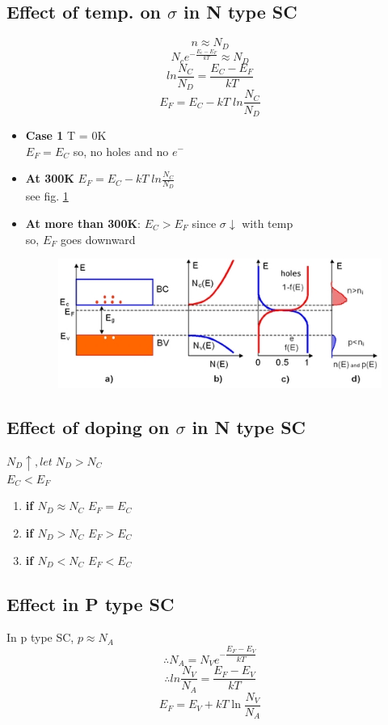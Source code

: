 \documentclass[10pt, a4paper]{report}
\begin{document}
	\subsection{Effect of temp. on $ \sigma $ in N type SC}
	$$ n \approx N_D $$
	$$ N_c  e^{-\frac{E_c-E_F}{kT}}  \approx N_D$$
	$$ ln\frac{N_C}{N_D}  = \frac{E_C - E_F}{kT}$$
	$$ E_F = E_C - kT\; ln \frac{N_C}{N_D} $$
	\begin{itemize}
		\item \textbf{Case 1} T = 0K \\
		$ E_F = E_C $ so, no holes and no $ e^- $
		\item \textbf{At 300K} $ E_F = E_C - k T\; ln \frac{N_C}{N_D} $ \\
		see fig. \ref{fig:fermilvlntype}
		\item \textbf{At more than 300K}: $ E_C > E_F $ since $\sigma$$\downarrow$ with temp \\
		so, $ E_F $ goes downward
		\begin{figure}
			\centering
			\includegraphics[width=0.7\linewidth]{img/fermi_lvl_ntype}
			\caption{}
			\label{fig:fermilvlntype}
		\end{figure}
	\end{itemize}
	\subsection{Effect of doping on $ \sigma $ in N type SC}
	$ N_D \uparrow, let \; N_D > N_C $\\
	$ E_C < E_F $
	\begin{enumerate}
		\item \textbf{if $ N_D \approx N_C $} $ E_F = E_C $
		\item \textbf{if $ N_D > N_C $} $ E_F > E_C $
		\item \textbf{if $ N_D < N_C $} $ E_F < E_C $
	\end{enumerate}
	\subsection{Effect in P type SC}
	In p type SC, $ p \approx N_A $
	$$ \therefore N_A = N_V e^{-\dfrac{E_F-E_V}{kT}} $$
	$$ \therefore ln\dfrac{N_V}{N_A}  = {\dfrac{E_F-E_V}{kT}}$$
	$$ E_F = E_V + kT \ln\dfrac{N_V}{N_A} $$
\end{document}
